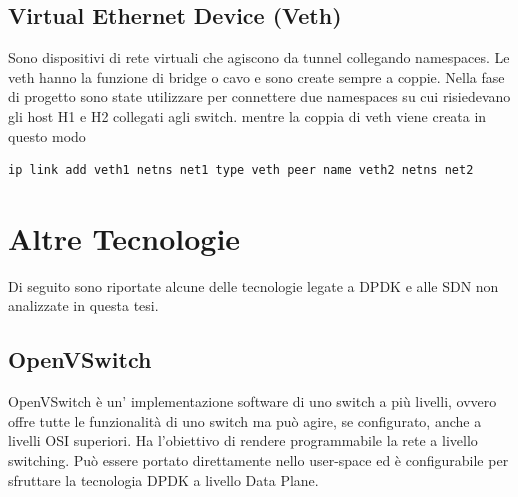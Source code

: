 \subsection*{Virtual Ethernet Device (Veth)}
Sono dispositivi di rete virtuali che agiscono da tunnel collegando namespaces. Le veth \cite{noauthor_veth} hanno la funzione di bridge o cavo e sono create sempre a coppie. Nella fase di progetto sono state utilizzare per connettere due namespaces su cui risiedevano gli host H1 e H2 collegati agli switch.
mentre la coppia di veth viene creata in questo modo
\begin{verbatim}
ip link add veth1 netns net1 type veth peer name veth2 netns net2
\end{verbatim}
\section*{Altre Tecnologie}
Di seguito sono riportate alcune delle tecnologie legate a DPDK e alle SDN non analizzate in questa tesi.
\subsection*{OpenVSwitch}
OpenVSwitch è un' implementazione software di uno switch a più livelli, ovvero offre tutte le funzionalità di uno switch ma può agire, se configurato, anche a livelli OSI superiori. Ha l'obiettivo di rendere programmabile la rete a livello switching. Può essere portato direttamente nello user-space ed è configurabile per sfruttare la tecnologia DPDK a livello Data Plane.\\


